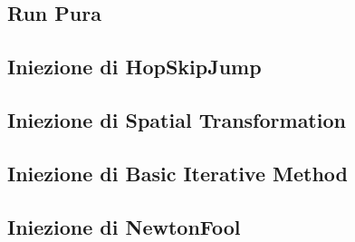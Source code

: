 \subsection{Run Pura}

\subsection{Iniezione di HopSkipJump}

\subsection{Iniezione di Spatial Transformation}

\subsection{Iniezione di Basic Iterative Method}

\subsection{Iniezione di NewtonFool}